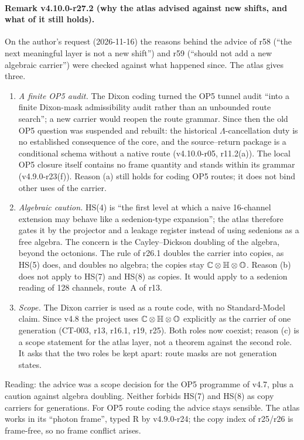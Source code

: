 \paragraph{Remark v4.10.0-r27.2 (why the atlas advised against new shifts, and what of it still holds).}
On the author's request (2026-11-16) the reasons behind the advice of r58 (``the next meaningful layer is not a new shift'') and r59
(``should not add a new algebraic carrier'') were checked against what happened since.  The atlas gives three.
\begin{enumerate}[leftmargin=2em]
\item[(a)] \emph{A finite OP5 audit.}  The Dixon coding turned the OP5 tunnel audit ``into a finite Dixon-mask admissibility audit rather
than an unbounded route search''; a new carrier would reopen the route grammar.  Since then the old OP5 question was suspended and rebuilt:
the historical \(\Lambda\)-cancellation duty is no established consequence of the core, and the source--return package is a conditional
schema without a native route (v4.10.0-r05, r11.2(a)).  The local OP5 closure itself contains no frame quantity and stands within its
grammar (v4.9.0-r23(f)).  Reason (a) still holds for coding OP5 routes; it does not bind other uses of the carrier.
\item[(b)] \emph{Algebraic caution.}  HS(4) is ``the first level at which a naive 16-channel extension may behave like a sedenion-type
expansion''; the atlas therefore gates it by the projector and a leakage register instead of using sedenions as a free algebra.  The
concern is the Cayley--Dickson doubling of the algebra, beyond the octonions.  The rule of r26.1 doubles the carrier into copies, as HS(5)
does, and doubles no algebra; the copies stay \(\mathbb C\otimes\mathbb H\otimes\mathbb O\).  Reason (b) does not apply to HS(7) and HS(8) as copies.  It would
apply to a sedenion reading of 128 channels, route~A of r13.
\item[(c)] \emph{Scope.}  The Dixon carrier is used as a route code, with no Standard-Model claim.  Since v4.8 the project uses
\(\mathbb C\otimes\mathbb H\otimes\mathbb O\) explicitly as the carrier of one generation (CT-003, r13, r16.1, r19, r25).  Both roles now coexist; reason (c) is a
scope statement for the atlas layer, not a theorem against the second role.  It asks that the two roles be kept apart: route masks are not
generation states.
\end{enumerate}
Reading: the advice was a scope decision for the OP5 programme of v4.7, plus a caution against algebra doubling.  Neither forbids HS(7)
and HS(8) as copy carriers for generations.  For OP5 route coding the advice stays sensible.  The atlas works in its ``photon frame'',
typed R by v4.9.0-r24; the copy index of r25/r26 is frame-free, so no frame conflict arises.


